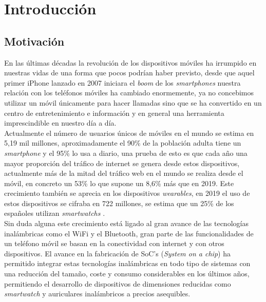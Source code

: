 \documentclass[../proyecto.tex]{subfiles}
\begin{document}
\chapter{Introducción}
\section{Motivación}

En las últimas décadas la revolución de los dispositivos móviles ha irrumpido en nuestras vidas de una forma que pocos podrían haber previsto, desde que aquel primer iPhone lanzado en 2007 iniciara el \textit{boom} de los \textit{smartphones} nuestra relación con los teléfonos móviles ha cambiado enormemente, ya no concebimos utilizar un móvil únicamente para hacer llamadas sino que se ha convertido en un centro de entretenimiento e información y en general una herramienta imprescindible en nuestro día a día.\\

Actualmente el número de usuarios únicos de móviles en el mundo se estima en 5,19 mil millones, aproximadamente el 90\% de la población adulta tiene un \textit{smartphone} y el 95\% lo usa a diario, una prueba de esto es que cada año una mayor proporción del tráfico de internet se genera desde estos dispositivos, actualmente más de la mitad del tráfico web en el mundo se realiza desde el móvil, en concreto un 53\% lo que supone un 8,6\% más que en 2019. Este crecimiento también se aprecia en los dispositivos \textit{wearables}, en 2019 el uso de estos dispositivos se cifraba en 722 millones, se estima que un 25\% de los españoles utilizan  \textit{smartwatchs} \cite{informe_ditendria}.\\

Sin duda alguna este crecimiento está ligado al gran avance de las tecnologías inalámbricas como el WiFi y el Bluetooth, gran parte de las funcionalidades de un teléfono móvil se basan en la conectividad con internet y con otros dispositivos. El avance en la fabricación de SoC's (\textit{System on a chip}) ha permitido integrar estas tecnologías inalámbricas en todo tipo de sistemas con una reducción del tamaño, coste y consumo considerables en los últimos años, permitiendo el desarrollo de dispositivos de dimensiones reducidas como \textit{smartwatch} y auriculares inalámbricos a precios asequibles.\\
\end{document}
